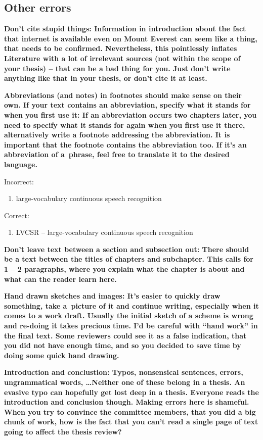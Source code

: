 \subsection*{Other errors}

\bf Don't cite stupid things: \rm Information in introduction about the fact that internet is available even on Mount Everest can seem like a thing, that needs to be confirmed. Nevertheless, this pointlessly inflates Literature with a lot of irrelevant sources (not within the scope of your thesis) -- that can be a bad thing for you. Just don't write anything like that in your thesis, or don't cite it at least.

\bf Abbreviations (and notes) in footnotes should make sense on their own. If your text contains an abbreviation, specify what it stands for when you first use it: \rm If an abbreviation occurs two chapters later, you need to specify what it stands for again when you first use it there, alternatively write a footnote addressing the abbreviation. It is important that the footnote contains the abbreviation too. If it's an abbreviation of a~phrase, feel free to translate it to the desired language.

\noindent Incorrect:
\begin{enumerate}
  \item{large-vocabulary continuous speech recognition}
\end{enumerate}
Correct:
\begin{enumerate}
  \item{LVCSR -- large-vocabulary continuous speech recognition}
\end{enumerate}

\bf Don't leave text between a section and subsection out: \rm There should be a text between the titles of chapters and subchapter. This calls for 1 -- 2 paragraphs, where you explain what the chapter is about and what can the reader learn here.

\bf Hand drawn sketches and images: \rm It's easier to quickly draw something, take a~picture of it and continue writing, especially when it comes to a work draft. Usually the initial sketch of a scheme is wrong and re-doing it takes precious time. I'd be careful with ``hand work'' in the final text. Some reviewers could see it as a false indication, that you did not have enough time, and so you decided to save time by doing some quick hand drawing.

\bf Introduction and conclustion: \rm Typos, nonsensical sentences, errors, ungrammatical words, \ldots Neither one of these belong in a thesis. An evasive typo can hopefully get lost deep in a thesis. Everyone reads the introduction and conclusion though. Making errors here is shameful. When you try to convince the committee members, that you did a big chunk of work, how is the fact that you can't read a single page of text going to affect the thesis review?

